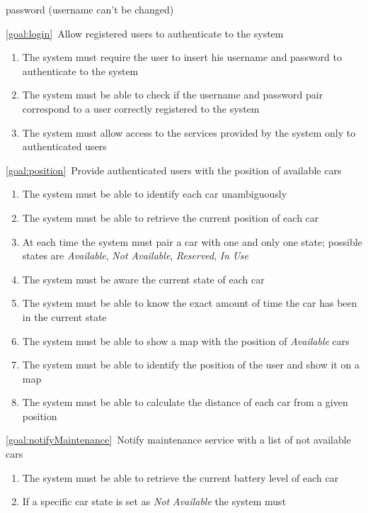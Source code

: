 \begin{description}
\begin{enumerate}[label=\textbf{R\arabic*}]
   				password (username can't be changed)
  			\end{enumerate}
		\item \ref{goal:login}\ Allow registered users to authenticate to the system
			\begin{enumerate}[resume*]
  				\item The system must require the user to insert his username and password to
  				authenticate to the system
   				\item The system must be able to check if the username and password pair
   				correspond to a user correctly registered to the system
   				\item The system must allow access to the services provided by the system only to
   				authenticated users 
			\end{enumerate}
		\item \ref{goal:position}\ Provide authenticated users with the position of available cars
			\begin{enumerate}[resume*]
				\item The system must be able to identify each car unambiguously
  				\item The system must be able to retrieve the current position of each car
  				\item At each time the system must pair a car with one and only one state; possible
  				states are \emph{Available}, \emph{Not Available}, \emph{Reserved}, \emph{In Use}
   				\item The system must be aware the current state of each car
   				\item The system must be able to know the exact amount of time the car has been in
   				the current state
   				\item The system must be able to show a map with the position of \emph{Available}
   				cars
  				\item The system must be able to identify the position of the user and show it on a
  				map
   				\item The system must be able to calculate the distance of each car from a given
   				position
  			\end{enumerate}
		\item \ref{goal:notifyMaintenance}\ Notify maintenance service with a list of not available
		cars
			\begin{enumerate}[resume*]
   				\item The system must be able to retrieve the current battery level of each car
   				\item If a specific car state is set as \emph{Not Available} the system must 

\end{enumerate}
\end{description}
